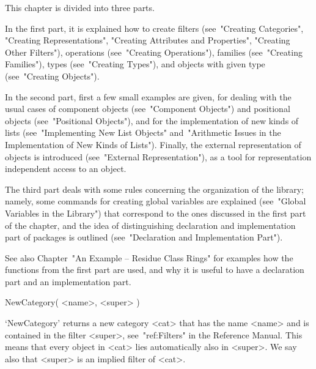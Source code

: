

This chapter is divided into three parts.

In the first part, it is explained how to create
filters (see~"Creating Categories", "Creating Representations",
"Creating Attributes and Properties", "Creating Other Filters"),
operations (see~"Creating Operations"),
families (see~"Creating Families"),
types (see~"Creating Types"),
and objects with given type (see~"Creating Objects").

In the second part, first a few small examples are given,
for dealing with the usual cases of
component objects (see~"Component Objects")
and positional objects (see~"Positional Objects"),
and for the implementation of new kinds of lists
(see~"Implementing New List Objects"
and~"Arithmetic Issues in the Implementation of New Kinds of Lists").
Finally, the external representation of objects is introduced
(see~"External Representation"),
as a tool for representation independent access to an object.

The third part deals with some rules concerning the organization
of the {\GAP} library;
namely, some commands for creating global variables are explained
(see~"Global Variables in the Library")
that correspond to the ones discussed in the first part of the chapter,
and the idea of distinguishing declaration and implementation part
of {\GAP} packages is outlined (see~"Declaration and Implementation Part").

See also Chapter~"An Example -- Residue Class Rings" for examples
how the functions from the first part are used,
and why it is useful to have a declaration part and an implementation part.



\>NewCategory( <name>, <super> )

`NewCategory' returns a new category <cat> that has the name <name> and
is contained in the filter <super>,
see~"ref:Filters" in the Reference Manual.
This means that every object in <cat> lies automatically also in <super>.
We say also that <super> is an implied filter of <cat>.

